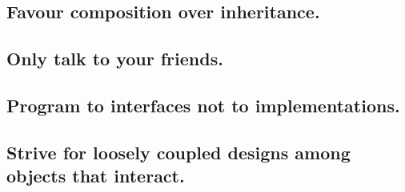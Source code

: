 \documentclass{beamer}
\begin{document}
\subsection{Favour composition over inheritance.}

\subsection{Only talk to your friends.}

\subsection{Program to interfaces not to implementations.}

\subsection{Strive for loosely coupled designs among objects that interact.}


\begin{frame}{}
\end{frame}
\end{document}
